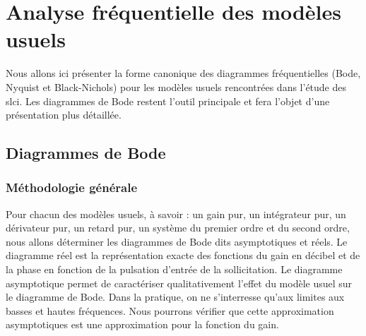 \section{Analyse fréquentielle des modèles usuels}
Nous allons ici présenter la forme canonique des diagrammes fréquentielles 
(Bode, Nyquist et Black-Nichols) pour les modèles usuels rencontrées dans 
l'étude des \gls{slci}. Les diagrammes de Bode restent l'outil principale et 
fera l'objet d'une présentation plus détaillée.
\subsection{Diagrammes de Bode}
\subsubsection{Méthodologie générale}
Pour chacun des modèles usuels, à savoir : un gain pur, un intégrateur pur,
un dérivateur pur, un retard pur, un système du premier ordre et du second 
ordre, nous allons déterminer les diagrammes de Bode dits asymptotiques 
et réels. Le diagramme réel est la représentation exacte des fonctions du gain
en décibel et de la phase en fonction de la pulsation d'entrée de 
la sollicitation. Le diagramme asymptotique permet de caractériser 
qualitativement l'effet du modèle usuel sur le diagramme de Bode. 
Dans la pratique, on ne s'interresse qu'aux limites aux basses et hautes 
fréquences. Nous pourrons vérifier que cette approximation asymptotiques est une
approximation pour la fonction du gain.

